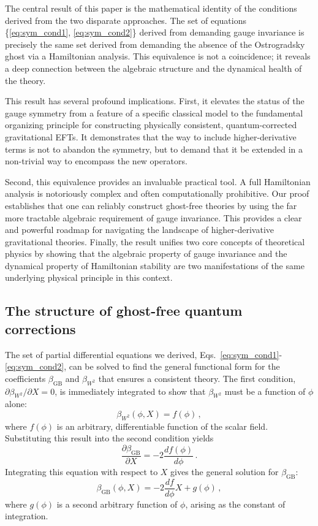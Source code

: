 \documentclass[twocolumn]{aastex631}
\begin{document}
The central result of this paper is the mathematical identity of the conditions derived from the two disparate approaches. The set of equations \{\eqref{eq:sym_cond1}, \eqref{eq:sym_cond2}\} derived from demanding gauge invariance is precisely the same set derived from demanding the absence of the Ostrogradsky ghost via a Hamiltonian analysis. This equivalence is not a coincidence; it reveals a deep connection between the algebraic structure and the dynamical health of the theory.

This result has several profound implications. First, it elevates the status of the gauge symmetry from a feature of a specific classical model to the fundamental organizing principle for constructing physically consistent, quantum-corrected gravitational EFTs. It demonstrates that the way to include higher-derivative terms is not to abandon the symmetry, but to demand that it be extended in a non-trivial way to encompass the new operators.

Second, this equivalence provides an invaluable practical tool. A full Hamiltonian analysis is notoriously complex and often computationally prohibitive. Our proof establishes that one can reliably construct ghost-free theories by using the far more tractable algebraic requirement of gauge invariance. This provides a clear and powerful roadmap for navigating the landscape of higher-derivative gravitational theories. Finally, the result unifies two core concepts of theoretical physics by showing that the algebraic property of gauge invariance and the dynamical property of Hamiltonian stability are two manifestations of the same underlying physical principle in this context.

\subsection{The structure of ghost-free quantum corrections}

The set of partial differential equations we derived, Eqs.~\eqref{eq:sym_cond1}-\eqref{eq:sym_cond2}, can be solved to find the general functional form for the coefficients $\beta_{\text{GB}}$ and $\beta_{W^2}$ that ensures a consistent theory. The first condition, $\partial\beta_{W^2}/\partial X = 0$, is immediately integrated to show that $\beta_{W^2}$ must be a function of $\phi$ alone:
\begin{equation}
    \beta_{W^2}(\phi, X) = f(\phi) \,,
\end{equation}
where $f(\phi)$ is an arbitrary, differentiable function of the scalar field. Substituting this result into the second condition yields
\begin{equation}
    \frac{\partial\beta_{\text{GB}}}{\partial X} = -2 \frac{df(\phi)}{d\phi} \,.
\end{equation}
Integrating this equation with respect to $X$ gives the general solution for $\beta_{\text{GB}}$:
\begin{equation}
    \beta_{\text{GB}}(\phi, X) = -2 \frac{df}{d\phi} X + g(\phi) \,,
\end{equation}
where $g(\phi)$ is a second arbitrary function of $\phi$, arising as the constant of integration.
\end{document}
